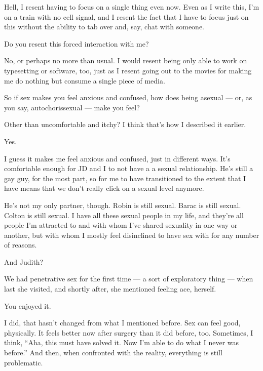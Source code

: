 \begin{paracol}{2}
\begin{leftcolumn}
Hell, I resent having to focus on a single thing even now. Even as I write this, I'm on a train with no cell signal, and I resent the fact that I have to focus just on this without the ability to tab over and, say, chat with someone.

\begin{ally}
Do you resent this forced interaction with me?
\end{ally}
No, or perhaps no more than usual. I would resent being only able to work on typesetting or software, too, just as I resent going out to the movies for making me do nothing but consume a single piece of media.
\newpage

\begin{ally}
So if sex makes you feel anxious and confused, how does being asexual --- or, as you say, autochorissexual --- make you feel?
\end{ally}
Other than uncomfortable and itchy? I think that's how I described it earlier.

\begin{ally}
Yes.
\end{ally}
I guess it makes me feel anxious and confused, just in different ways. It's comfortable enough for JD and I to not have a a sexual relationship. He's still a gay guy, for the most part, so for me to have transitioned to the extent that I have means that we don't really click on a sexual level anymore.

He's not my only partner, though. Robin is still sexual. Barac is still sexual. Colton is still sexual. I have all these sexual people in my life, and they're all people I'm attracted to and with whom I've shared sexuality in one way or another, but with whom I mostly feel disinclined to have sex with for any number of reasons.

\begin{ally}
And Judith?
\end{ally}
We had penetrative sex for the first time --- a sort of exploratory thing --- when last she visited, and shortly after, she mentioned feeling ace, herself.

\begin{ally}
You enjoyed it.
\end{ally}
I did, that hasn't changed from what I mentioned before. Sex can feel good, physically. It feels better now after surgery than it did before, too. Sometimes, I think, ``Aha, this must have solved it. Now I'm able to do what I never was before.'' And then, when confronted with the reality, everything is still problematic.


\end{leftcolumn}
\end{paracol}
